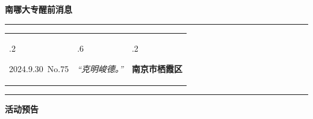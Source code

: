 \documentclass[letterpaper, 12pt]{article}
\begin{document}
\begin{center}
    \Huge\textbf{南哪大专醒前消息}
\end{center}
\vspace{4mm}
\hrule
\renewcommand\tabularxcolumn[1]{m{#1}}
\begin{tabularx}{\textwidth}{>{\hsize.2\hsize}X>{\hsize.6\hsize}X>{\hsize.2\hsize}X}
    \begin{flushleft}
        2024.9.30\, No.75
    \end{flushleft}
    &
    \begin{center}
        \textit{“克明峻德。”}
    \end{center}
    &
    \begin{flushright}
        \textbf{南京市栖霞区}
    \end{flushright}
\end{tabularx}
\vspace{-3.5mm}
\hrule
\vspace{4mm}
\centerline{\huge\textbf{活动预告}}
\end{document}
